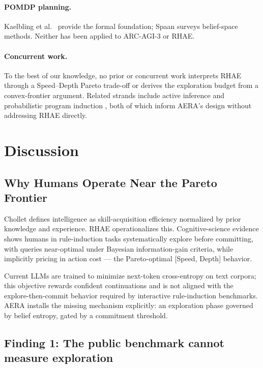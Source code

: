 \documentclass[11pt]{article}
\begin{document}
\paragraph{POMDP planning.} Kaelbling et al.\ \cite{kaelbling1998} provide the formal foundation; Spaan \cite{spaan2012} surveys belief-space methods. Neither has been applied to ARC-AGI-3 or RHAE.

\paragraph{Concurrent work.} To the best of our knowledge, no prior or concurrent work interprets RHAE through a Speed--Depth Pareto trade-off or derives the exploration budget from a convex-frontier argument. Related strands include active inference \cite{friston2010} and probabilistic program induction \cite{lake2015}, both of which inform AERA's design without addressing RHAE directly.

\section{Discussion}
\label{sec:discussion}

\subsection{Why Humans Operate Near the Pareto Frontier}

Chollet \cite{chollet2019} defines intelligence as skill-acquisition efficiency normalized by prior knowledge and experience. RHAE operationalizes this. Cognitive-science evidence \cite{rule2020,bramley2017} shows humans in rule-induction tasks systematically explore before committing, with queries near-optimal under Bayesian information-gain criteria, while implicitly pricing in action cost --- the Pareto-optimal [Speed, Depth] behavior.

Current LLMs are trained to minimize next-token cross-entropy on text corpora; this objective rewards confident continuations and is not aligned with the explore-then-commit behavior required by interactive rule-induction benchmarks. AERA installs the missing mechanism explicitly: an exploration phase governed by belief entropy, gated by a commitment threshold.

\subsection*{Finding 1: The public benchmark cannot measure exploration}
\label{sec:benchmark-critique}
\end{document}
